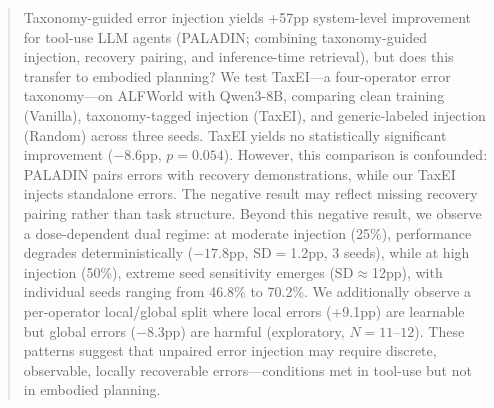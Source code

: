 \begin{abstract}
Taxonomy-guided error injection yields +57pp system-level improvement for tool-use LLM agents (PALADIN; combining taxonomy-guided injection, recovery pairing, and inference-time retrieval), but does this transfer to embodied planning? We test TaxEI---a four-operator error taxonomy---on ALFWorld with Qwen3-8B, comparing clean training (Vanilla), taxonomy-tagged injection (TaxEI), and generic-labeled injection (Random) across three seeds. TaxEI yields no statistically significant improvement ($-8.6$pp, $p{=}0.054$). However, this comparison is confounded: PALADIN pairs errors with recovery demonstrations, while our TaxEI injects standalone errors. The negative result may reflect missing recovery pairing rather than task structure. Beyond this negative result, we observe a dose-dependent dual regime: at moderate injection (25\%), performance degrades deterministically ($-17.8$pp, SD${=}$1.2pp, 3 seeds), while at high injection (50\%), extreme seed sensitivity emerges (SD${\approx}$12pp), with individual seeds ranging from 46.8\% to 70.2\%. We additionally observe a per-operator local/global split where local errors (+9.1pp) are learnable but global errors ($-8.3$pp) are harmful (exploratory, $N{=}11$--$12$). These patterns suggest that unpaired error injection may require discrete, observable, locally recoverable errors---conditions met in tool-use but not in embodied planning.
\end{abstract}
